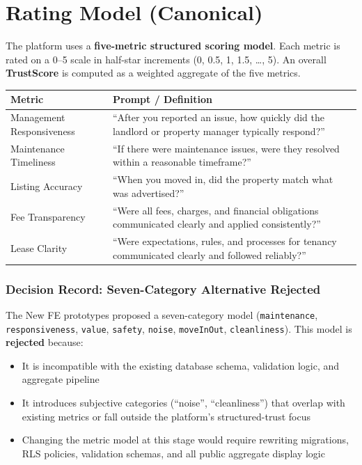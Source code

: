 \documentclass[11pt,letterpaper]{article}
\begin{document}
\section{Rating Model (Canonical)}

The platform uses a \textbf{five-metric structured scoring model}. Each metric is rated on a 0--5 scale in half-star increments (0, 0.5, 1, 1.5, \ldots, 5). An overall \textbf{TrustScore} is computed as a weighted aggregate of the five metrics.

\begin{longtable}{p{4.5cm} p{8.5cm}}
\toprule
\textbf{Metric} & \textbf{Prompt / Definition} \\
\midrule
\endhead
Management Responsiveness &
``After you reported an issue, how quickly did the landlord or property manager typically respond?'' \\
\addlinespace
Maintenance Timeliness &
``If there were maintenance issues, were they resolved within a reasonable timeframe?'' \\
\addlinespace
Listing Accuracy &
``When you moved in, did the property match what was advertised?'' \\
\addlinespace
Fee Transparency &
``Were all fees, charges, and financial obligations communicated clearly and applied consistently?'' \\
\addlinespace
Lease Clarity &
``Were expectations, rules, and processes for tenancy communicated clearly and followed reliably?'' \\
\bottomrule
\end{longtable}

\subsubsection{Decision Record: Seven-Category Alternative Rejected}

The New FE prototypes proposed a seven-category model (\texttt{maintenance}, \texttt{responsiveness}, \texttt{value}, \texttt{safety}, \texttt{noise}, \texttt{moveInOut}, \texttt{cleanliness}). This model is \textbf{rejected} because:
\begin{itemize}
    \item It is incompatible with the existing database schema, validation logic, and aggregate pipeline
    \item It introduces subjective categories (``noise'', ``cleanliness'') that overlap with existing metrics or fall outside the platform's structured-trust focus
    \item Changing the metric model at this stage would require rewriting migrations, RLS policies, validation schemas, and all public aggregate display logic
\end{itemize}
\end{document}
